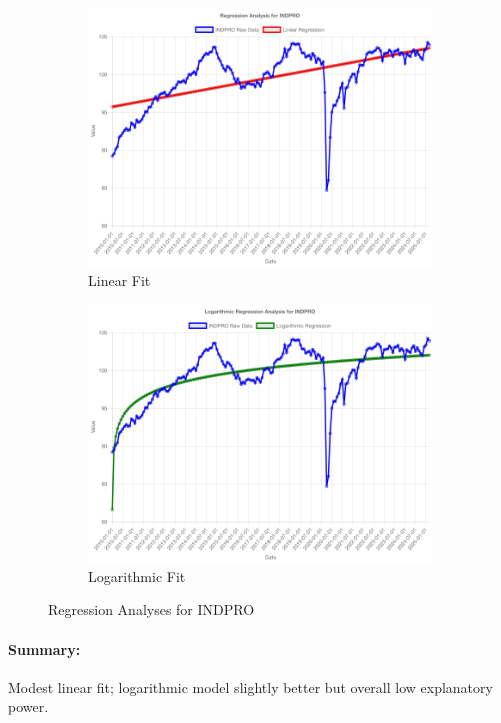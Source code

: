 \documentclass[11pt,a4paper]{article}
\begin{document}
\begin{figure}[htbp]
  \centering
  \begin{subfigure}[b]{0.48\textwidth}
    \includegraphics[width=\textwidth]{backend/analyses/INDPRO_analysis.png}
    \caption{Linear Fit}
  \end{subfigure}
  \hfill
  \begin{subfigure}[b]{0.48\textwidth}
    \includegraphics[width=\textwidth]{backend/analyses/INDPRO_log_analysis.png}
    \caption{Logarithmic Fit}
  \end{subfigure}
  \caption{Regression Analyses for INDPRO}
\end{figure}

\paragraph{Summary:}
Modest linear fit; logarithmic model slightly better but overall low explanatory power.
\end{document}
